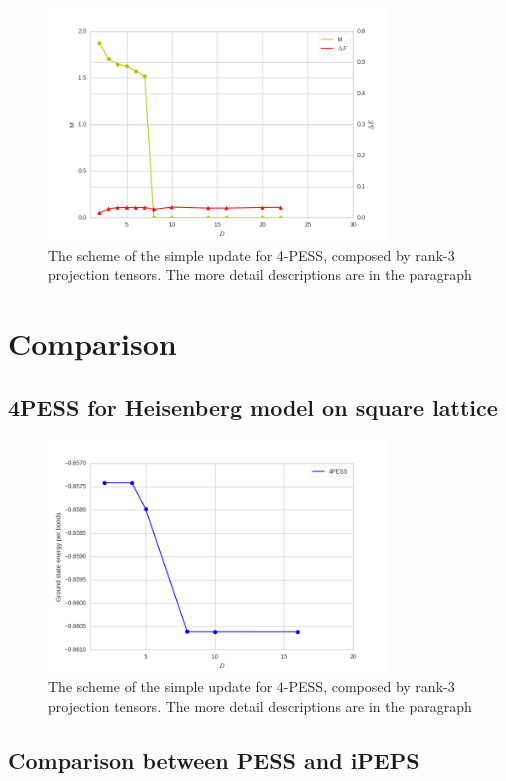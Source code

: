 \begin{figure}[!ht]
	\centering
	\includegraphics[width=0.80\textwidth]{figures/3pess_S2M.png}
	\caption[The scheme of the simple update for 4-PESS, composed by rank-3 projection tensors.]{The scheme of the simple update for 4-PESS, composed by rank-3 projection tensors. The more detail descriptions are in the paragraph}
	\label{fig4330}
\end{figure}

\section{Comparison}
\subsection{4PESS for Heisenberg model on square lattice}

\begin{figure}[ht]
	\centering
	\includegraphics[width=0.80\textwidth]{figures/4pess_HeiGE.png}
	\caption[The scheme of the simple update for 4-PESS, composed by rank-3 projection tensors.]{The scheme of the simple update for 4-PESS, composed by rank-3 projection tensors. The more detail descriptions are in the paragraph}
	\label{fig4331}
\end{figure}

\subsection{Comparison between PESS and iPEPS}

